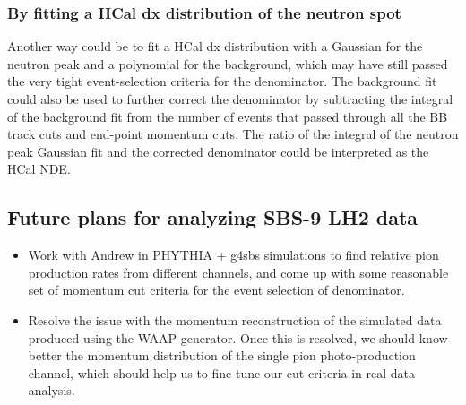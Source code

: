 \subsubsection{By fitting a HCal  dx distribution of the neutron spot}
Another way could be to fit a HCal dx distribution with a Gaussian for the neutron peak and a polynomial for the background, which may have still passed the very tight event-selection criteria for the denominator. The background fit could also be used to further correct the denominator by subtracting the integral of the background fit from the number of events that passed through all the BB track cuts and end-point momentum cuts. The ratio of the integral of the neutron peak Gaussian fit and the corrected denominator could be interpreted as the HCal NDE.

\subsection{Future plans for analyzing SBS-9 LH2 data}
\begin{itemize}
    \item Work with Andrew in PHYTHIA + g4sbs simulations to find relative pion production rates from different channels, and come up with some reasonable set of momentum cut criteria for the event selection of denominator.
    \item Resolve the issue with the momentum reconstruction of the simulated data produced using the WAAP generator. Once this is resolved, we should know better the momentum distribution of the single pion photo-production channel, which should help us to fine-tune our cut criteria in real data analysis.
\end{itemize}




